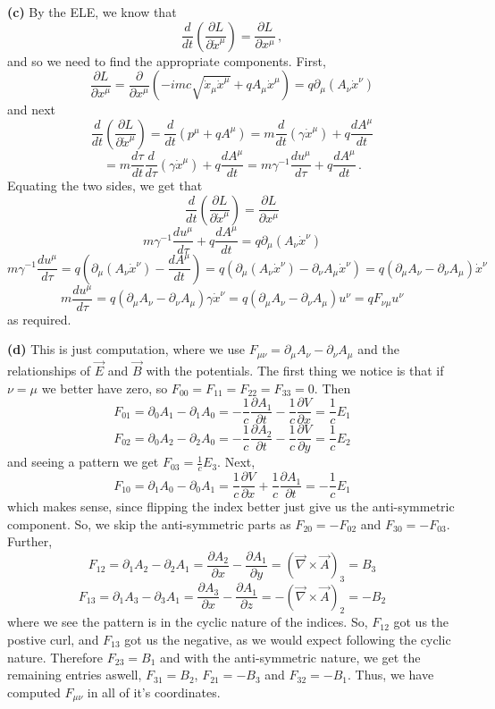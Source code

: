\documentclass[10pt]{article}
\newcommand{\di}[2][]{\frac{\partial #1}{\partial #2}}
\newcommand{\del}[2][]{\frac{d #1}{d #2}}
\begin{document}
\textbf{(c)} By the ELE, we know that
\[ \del{t}\left(\di[L]{\dot{x}^{\mu}}\right) = \di[L]{x^{\mu}} \,,\]
and so we need to find the appropriate components. First,
\[ \di[L]{x^{\mu}} = \di{x^{\mu}}\left(-imc\sqrt{\dot{x}_{\mu}\dot{x}^{\mu}} + qA_{\mu}\dot{x}^{\mu}\right) = q\partial_{\mu}(A_{\nu}\dot{x}^{\nu})\]
and next
\[ \del{t}\left(\di[L]{\dot{x}^{\mu}}\right) = \del{t}\left( p^{\mu} + qA^{\mu}\right) = m\del{t}\left(\gamma \dot{x}^{\mu}\right) + q\del[A^{\mu}]{t} \]
\[ = m\del[\tau]{t}\del{\tau}(\gamma \dot{x}^{\mu}) + q\del[A^{\mu}]{t} = m\gamma^{-1}\del[u^{\mu}]{\tau} + q\del[A^{\mu}]{t} \, .\]
Equating the two sides, we get that
\[ \del{t}\left(\di[L]{\dot{x}^{\mu}}\right) = \di[L]{x^{\mu}}\]
\[ m\gamma^{-1}\del[u^{\mu}]{\tau} + q\del[A^{\mu}]{t} = q\partial_{\mu}(A_{\nu}\dot{x}^{\nu}) \]
\[ m\gamma^{-1}\del[u^{\mu}]{\tau} = q\left(\partial_{\mu}(A_{\nu}\dot{x}^{\nu}) - \del[A^{\mu}]{t}\right) = q\left(\partial_{\mu}(A_{\nu}\dot{x}^{\nu}) - \partial_{\nu}A_{\mu}\dot{x}^{\nu}\right) = q\left(\partial_{\mu}A_{\nu} - \partial_{\nu}A_{\mu}\right)\dot{x}^{\nu}\]
\[ m\del[u^{\mu}]{\tau} = q\left(\partial_{\mu}A_{\nu} - \partial_{\nu}A_{\mu}\right)\gamma\dot{x}^{\nu} = q\left(\partial_{\mu}A_{\nu} - \partial_{\nu}A_{\mu}\right)u^{\nu} = qF_{\nu\mu}u^{\nu} \]
as required.

\textbf{(d)} This is just computation, where we use $F_{\mu\nu} =\partial_{\mu}A_{\nu} - \partial_{\nu}A_{\mu}$ and the relationships of $\vec{E}$ and $\vec{B}$ with the potentials. The first thing we notice is that if $\nu=\mu$ we better have zero, so $F_{00} = F_{11} = F_{22} = F_{33} = 0$. Then
\[ F_{01} = \partial_{0}A_{1} - \partial_{1}A_{0} = -\frac{1}{c}\di[A_{1}]{t} - \frac{1}{c}\di[V]{x} = \frac{1}{c}E_{1} \]
\[ F_{02} = \partial_{0}A_{2} - \partial_{2}A_{0} = -\frac{1}{c}\di[A_{2}]{t} - \frac{1}{c}\di[V]{y} = \frac{1}{c}E_{2} \]
and seeing a pattern we get $F_{03} = \frac{1}{c}E_{3}$. Next,
\[ F_{10} = \partial_{1}A_{0} - \partial_{0}A_{1} = \frac{1}{c}\di[V]{x} + \frac{1}{c}\di[A_{1}]{t} = -\frac{1}{c}E_{1}\]
which makes sense, since flipping the index better just give us the anti-symmetric component. So, we skip the anti-symmetric parts as $F_{20} = -F_{02}$ and $F_{30} = -F_{03}$. Further,
\[ F_{12} = \partial_{1}A_{2} - \partial_{2}A_{1} = \di[A_{2}]{x} - \di[A_{1}]{y} = \left(\vec{\nabla}\times \vec{A}\right)_{3} = B_{3}\]
\[ F_{13} = \partial_{1}A_{3} - \partial_{3}A_{1} = \di[A_{3}]{x} - \di[A_{1}]{z} = -\left(\vec{\nabla}\times \vec{A}\right)_{2} = -B_{2} \]
where we see the pattern is in the cyclic nature of the indices. So, $F_{12}$ got us the postive curl, and $F_{13}$ got us the negative, as we would expect following the cyclic nature. Therefore $F_{23} = B_{1}$ and with the anti-symmetric nature, we get the remaining entries aswell, $F_{31} = B_{2}$, $F_{21} = -B_{3}$ and $F_{32} = -B_{1}$. Thus, we have computed $F_{\mu\nu}$ in all of it's coordinates.
\end{document}
